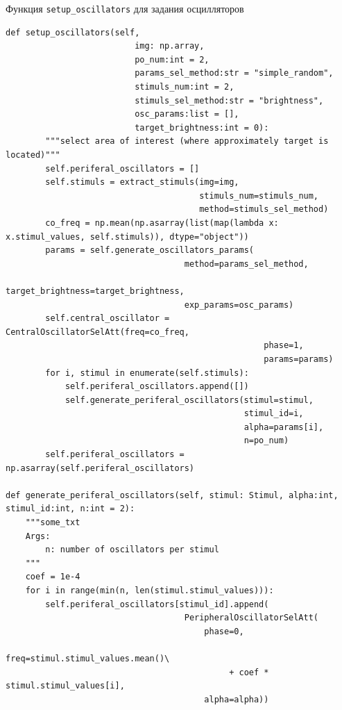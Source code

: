 \documentclass[14pt, russian]{scrartcl}
\begin{document}
\begin{listing}[H]
    \caption{Функция \texttt{setup\_oscillators} для задания осцилляторов}
    \label{lst:hyp_data}
    \begin{verbatim}
def setup_oscillators(self, 
                          img: np.array, 
                          po_num:int = 2, 
                          params_sel_method:str = "simple_random",
                          stimuls_num:int = 2,
                          stimuls_sel_method:str = "brightness",
                          osc_params:list = [],
                          target_brightness:int = 0):
        """select area of interest (where approximately target is located)"""
        self.periferal_oscillators = []
        self.stimuls = extract_stimuls(img=img,
                                       stimuls_num=stimuls_num,
                                       method=stimuls_sel_method)
        co_freq = np.mean(np.asarray(list(map(lambda x: x.stimul_values, self.stimuls)), dtype="object"))
        params = self.generate_oscillators_params(
                                    method=params_sel_method, 
                                    target_brightness=target_brightness,
                                    exp_params=osc_params)
        self.central_oscillator = CentralOscillatorSelAtt(freq=co_freq,
                                                    phase=1,
                                                    params=params)       
        for i, stimul in enumerate(self.stimuls):
            self.periferal_oscillators.append([])
            self.generate_periferal_oscillators(stimul=stimul, 
                                                stimul_id=i, 
                                                alpha=params[i],
                                                n=po_num)
        self.periferal_oscillators = np.asarray(self.periferal_oscillators)
        
def generate_periferal_oscillators(self, stimul: Stimul, alpha:int, stimul_id:int, n:int = 2):
    """some_txt
    Args:
        n: number of oscillators per stimul
    """
    coef = 1e-4
    for i in range(min(n, len(stimul.stimul_values))):
        self.periferal_oscillators[stimul_id].append(
                                    PeripheralOscillatorSelAtt(
                                        phase=0,
                                        freq=stimul.stimul_values.mean()\
                                             + coef * stimul.stimul_values[i],
                                        alpha=alpha))
    \end{verbatim}
\end{listing}
\end{document}
